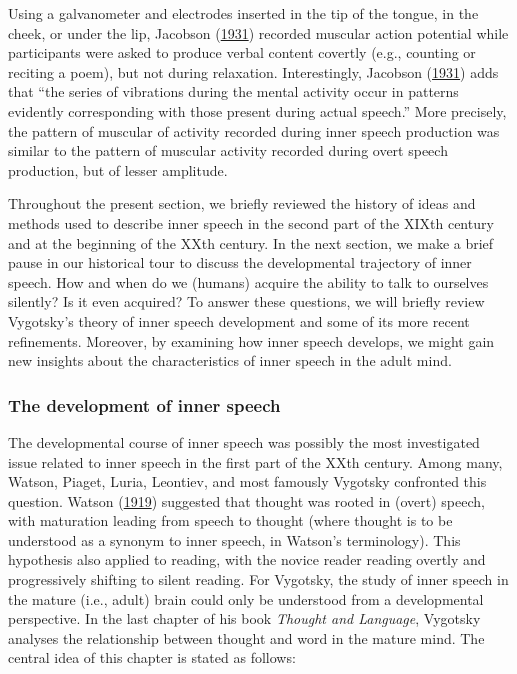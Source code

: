 \documentclass[a4paper,12pt,twoside,openright,oldfontcommands,final]{memoir}
\begin{document}
Using a galvanometer and electrodes inserted in the tip of the tongue, in the cheek, or under the lip, Jacobson (\protect\hyperlink{ref-jacobson_electrical_1931}{1931}) recorded muscular action potential while participants were asked to produce verbal content covertly (e.g., counting or reciting a poem), but not during relaxation. Interestingly, Jacobson (\protect\hyperlink{ref-jacobson_electrical_1931}{1931}) adds that \enquote{the series of vibrations during the mental activity occur in patterns evidently corresponding with those present during actual speech.} More precisely, the pattern of muscular of activity recorded during inner speech production was similar to the pattern of muscular activity recorded during overt speech production, but of lesser amplitude.

Throughout the present section, we briefly reviewed the history of ideas and methods used to describe inner speech in the second part of the XIXth century and at the beginning of the XXth century. In the next section, we make a brief pause in our historical tour to discuss the developmental trajectory of inner speech. How and when do we (humans) acquire the ability to talk to ourselves silently? Is it even acquired? To answer these questions, we will briefly review Vygotsky's theory of inner speech development and some of its more recent refinements. Moreover, by examining how inner speech develops, we might gain new insights about the characteristics of inner speech in the adult mind.

\hypertarget{development}{%
\subsubsection{The development of inner speech}\label{development}}

The developmental course of inner speech was possibly the most investigated issue related to inner speech in the first part of the XXth century. Among many, Watson, Piaget, Luria, Leontiev, and most famously Vygotsky confronted this question. Watson (\protect\hyperlink{ref-watson_psychology_1919}{1919}) suggested that thought was rooted in (overt) speech, with maturation leading from speech to thought (where thought is to be understood as a synonym to inner speech, in Watson's terminology). This hypothesis also applied to reading, with the novice reader reading overtly and progressively shifting to silent reading. For Vygotsky, the study of inner speech in the mature (i.e., adult) brain could only be understood from a developmental perspective. In the last chapter of his book \emph{Thought and Language}, Vygotsky analyses the relationship between thought and word in the mature mind. The central idea of this chapter is stated as follows:
\end{document}
